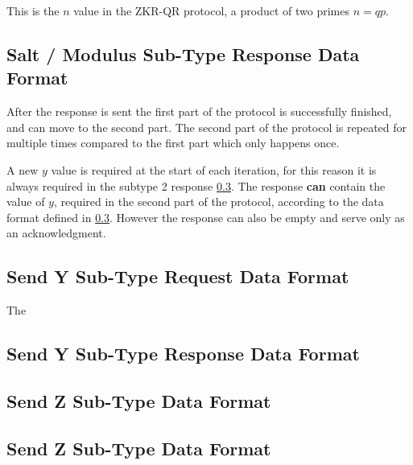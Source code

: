 This is the $n$ value in the ZKR-QR protocol, a product of two primes $n = qp$.

\subsection{Salt / Modulus Sub-Type Response Data Format}
After the response is sent the first part of the protocol is successfully finished, and can move to the second part.
The second part of the protocol is repeated for multiple times compared to the first part which only happens once. 

A new $y$ value is required at the start of each iteration, for this reason it is always required in the subtype 2 response \ref{subtype-2-response}. The response \textbf{can} contain the value of $y$, required in the second part of the protocol, according to the data format defined in \ref{subtype-2-response}. However the response can also be empty and serve only as an acknowledgment. %

\subsection{Send Y Sub-Type Request Data Format}
The 

\subsection{Send Y Sub-Type Response Data Format}
\label{subtype-2-response}

\subsection{Send Z Sub-Type Data Format}

\subsection{Send Z Sub-Type Data Format}

